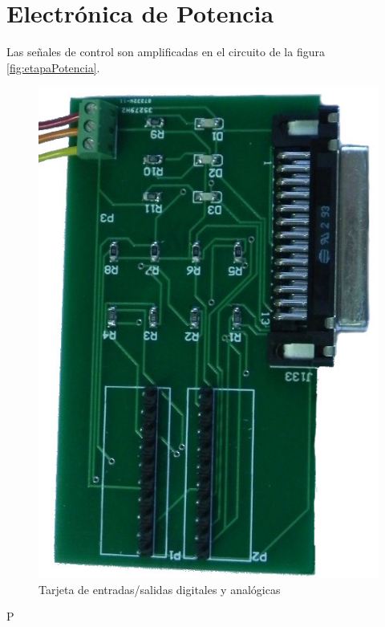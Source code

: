 \section*{Electrónica de Potencia}
Las señales de control son amplificadas en el circuito de la figura \ref{fig:etapaPotencia}.
\begin{figure}[htb!]
\centering
\includegraphics[scale=0.9]{FiguresP/TarjetaMaestro}
\caption{Tarjeta de entradas/salidas digitales y analógicas }
\label{fig:TarjetaMaestro}
\end{figure}


P

